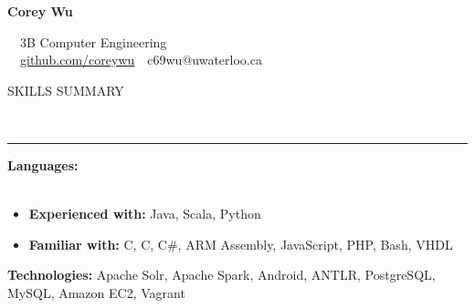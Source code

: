 \documentclass[11pt, letterpaper, oneside]{article}
\makeatletter
\newcommand{\name}{Corey Wu}
\newcommand{\program}{3B Computer Engineering}
\newcommand{\github}{\href{https://github.com/coreywu}{github.com/coreywu}}
\newcommand{\email}{c69wu@uwaterloo.ca}
\newcommand{\HRule}[2]{\textcolor{#1}{\rule{\linewidth}{#2}}}
\newcommand{\sectiontitle}[1]{\begin{minipage}{\textwidth}\vspace{-7.5pt}\begin{flushleft}\hspace{-20.5pt}\vspace{-25pt}
\Large\MakeUppercase{#1}\end{flushleft}\end{minipage}\\\HRule{black}{0.15mm}\vspace{\baselineskip}}
\newenvironment{ressection}[1]{
  \sectiontitle{#1}}
  {\vspace{-\baselineskip}}
\newcommand{\resentryheader}[4]{
    \vspace{-6pt}
    \textbf{#1}\hspace{\stretch{1}}\textcolor{black}{#3}\\
    \textit{#2}\hspace{\stretch{1}}\textcolor{black}{#4}\\
}
\newcommand{\resitem}[1]{
    \vspace{2pt}
    \item \begin{flushleft} #1 \end{flushleft}
}
\newcommand{\CPP}
{C\nolinebreak[4]\hspace{-.05em}\raisebox{.22ex}{\footnotesize\bf ++}}
\newenvironment{resentry}[4]{
  \begin{minipage}{\textwidth}
  \vspace{-3pt}
    \resentryheader{#1}{#2}{#3}{#4}
        \vspace{-\baselineskip}
    \begin{itemize}[noitemsep,nolistsep]
}{
    \end{itemize}
        \vspace{\baselineskip}
        \end{minipage}
}
\makeatother
\begin{document}
\begin{center}

	{\Huge \textbf{\name}}

	\ \ {\Large{\program}} \\
	\ \ \github \ \textbullet \ \email \ \
\end{center}

\vspace{-10pt}

\begin{ressection}{Skills Summary}
  \begin{resentry}{{Languages:}}{}{}{}
	\vspace{-15pt}    
    \resitem{\textbf{Experienced with:} Java, Scala, Python}
    \vspace{-2pt}
    \resitem{\textbf{Familiar with:} C, \CPP, C\#, ARM Assembly, JavaScript, PHP, Bash, VHDL}
    \vspace{-10pt}   
  \end{resentry}  
  \hspace{-20pt} \textbf{Technologies:} Apache Solr, Apache Spark, Android, ANTLR,  PostgreSQL, MySQL, Amazon EC2, Vagrant
\end{ressection}

\vspace{20pt}
\end{document}
